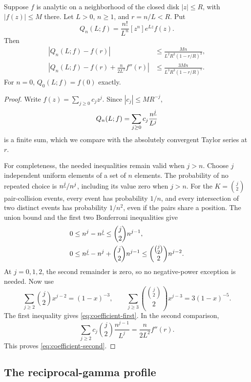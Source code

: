 \begin{lemma}\label{lem:coefficient}
Suppose \(f\) is analytic on a neighborhood of the closed disk
\(|z|\le R\), with \(|f(z)|\le M\) there. Let \(L>0\),
\(n\ge1\), and \(r=n/L<R\). Put
\[
Q_n(L;f)=\frac{n!}{L^n}[z^n]e^{Lz}f(z).
\]
Then
\begin{align}
|Q_n(L;f)-f(r)|
&\le\frac{Mn}{L^2R^2(1-r/R)^3},\label{eq:coefficient-first}\\
\left|Q_n(L;f)-f(r)+\frac{n}{2L^2}f''(r)\right|
&\le\frac{3Mn}{L^3R^3(1-r/R)^5}.\label{eq:coefficient-second}
\end{align}
For \(n=0\), \(Q_0(L;f)=f(0)\) exactly.
\end{lemma}

\begin{proof}
Write \(f(z)=\sum_{j\ge0}c_jz^j\). Since \(|c_j|\le MR^{-j}\),
\[
Q_n(L;f)=\sum_{j\ge0}c_j\frac{n^{\underline{j}}}{L^j}
\]
is a finite sum, which we compare with the absolutely convergent
Taylor series at \(r\).

For completeness, the needed inequalities remain valid when \(j>n\).
Choose \(j\) independent uniform elements of a set of \(n\) elements.
The probability of no repeated choice is
\(n^{\underline{j}}/n^j\), including its value zero when \(j>n\).
For the \(K=\binom j2\) pair-collision events, every event has
probability \(1/n\), and every intersection of two distinct events
has probability \(1/n^2\), even if the pairs share a position.
The union bound and the first two Bonferroni inequalities give
\begin{align*}
0&\le n^j-n^{\underline{j}}\le\binom j2 n^{j-1},\\
0&\le n^{\underline{j}}-n^j+\binom j2 n^{j-1}
 \le\binom{\binom j2}{2}n^{j-2}.
\end{align*}
At \(j=0,1,2\), the second remainder is zero, so no negative-power
exception is needed. Now use
\[
\sum_{j\ge2}\binom j2 x^{j-2}=(1-x)^{-3},
\qquad
\sum_{j\ge3}\binom{\binom j2}{2}x^{j-3}=3(1-x)^{-5}.
\]
The first inequality gives \eqref{eq:coefficient-first}.
In the second comparison,
\[
\sum_{j\ge2}c_j\binom j2\frac{n^{j-1}}{L^j}
=\frac{n}{2L^2}f''(r).
\]
This proves \eqref{eq:coefficient-second}.
\end{proof}

\subsection{The reciprocal-gamma profile}

